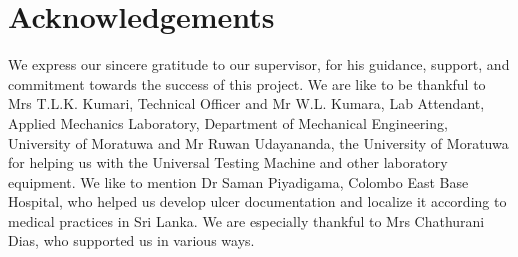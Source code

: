\chapter*{Acknowledgements}

\vspace{10mm}
We express our sincere gratitude to our supervisor, \supervisorA \space for his guidance, support, and commitment towards the success of this project. We are like to be thankful to Mrs T.L.K. Kumari, Technical Officer and Mr W.L. Kumara, Lab Attendant, Applied Mechanics Laboratory, Department of Mechanical Engineering, University of Moratuwa and Mr Ruwan Udayananda, the University of Moratuwa for helping us with the Universal Testing Machine and other laboratory equipment. We like to mention Dr Saman Piyadigama, Colombo East Base Hospital, who helped us develop ulcer documentation and localize it according to medical practices in Sri Lanka. We are especially thankful to Mrs Chathurani Dias, who supported us in various ways. 
